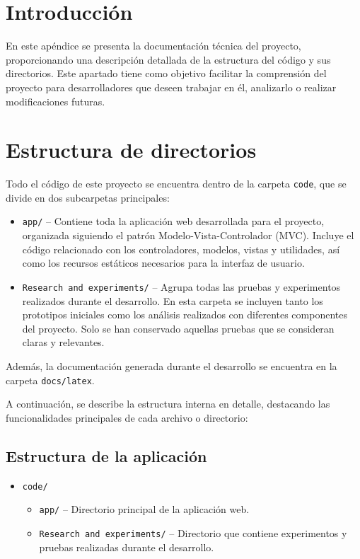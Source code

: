 
\section{Introducción}

En este apéndice se presenta la documentación técnica del proyecto, proporcionando una descripción detallada de la estructura del código y sus directorios. Este apartado tiene como objetivo facilitar la comprensión del proyecto para desarrolladores que deseen trabajar en él, analizarlo o realizar modificaciones futuras.

\section{Estructura de directorios}

Todo el código de este proyecto se encuentra dentro de la carpeta \texttt{code}, que se divide en dos subcarpetas principales:

\begin{itemize}
    \item \texttt{app/} -- Contiene toda la aplicación web desarrollada para el proyecto, organizada siguiendo el patrón Modelo-Vista-Controlador (MVC). Incluye el código relacionado con los controladores, modelos, vistas y utilidades, así como los recursos estáticos necesarios para la interfaz de usuario.
    \item \texttt{Research and experiments/} -- Agrupa todas las pruebas y experimentos realizados durante el desarrollo. En esta carpeta se incluyen tanto los prototipos iniciales como los análisis realizados con diferentes componentes del proyecto. Solo se han conservado aquellas pruebas que se consideran claras y relevantes.
\end{itemize}

Además, la documentación generada durante el desarrollo se encuentra en la carpeta \texttt{docs/latex}.

A continuación, se describe la estructura interna en detalle, destacando las funcionalidades principales de cada archivo o directorio:

\subsection*{Estructura de la aplicación}
            
\begin{itemize}
    \item \texttt{code/}
    \begin{itemize}
        \item \texttt{app/} -- Directorio principal de la aplicación web.
        \item \texttt{Research and experiments/} -- Directorio que contiene experimentos y pruebas realizadas durante el desarrollo.
    \end{itemize}
\end{itemize}

